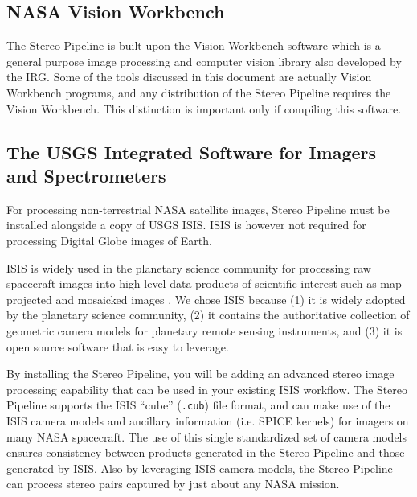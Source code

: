 \subsection{NASA Vision Workbench}

The Stereo Pipeline is built upon the Vision Workbench software
which is a general purpose image processing and computer vision
library also developed by the \ac{IRG}.  Some of the tools discussed
in this document are actually Vision Workbench programs, and any
distribution of the Stereo Pipeline requires the Vision Workbench.
This distinction is important only if compiling this software.

\subsection{The USGS Integrated Software for Imagers and Spectrometers}

For processing non-terrestrial NASA satellite images, Stereo Pipeline
must be installed alongside a copy of \ac{USGS} \ac{ISIS}. \ac{ISIS} is
however not required for processing Digital Globe images of Earth.

\ac{ISIS} is widely used in the planetary science community
for processing raw spacecraft images into high level data products of
scientific interest such as map-projected and mosaicked images
\cite{2004LPI....35.2039A, 1997LPI....28..387G, ISIS_website}.  We
chose \ac{ISIS} because (1) it is widely adopted by the planetary
science community, (2) it contains the authoritative collection of
geometric camera models for planetary remote sensing instruments, and
(3) it is open source software that is easy to leverage.

By installing the Stereo Pipeline, you will be adding an advanced
stereo image processing capability that can be used in your existing
\ac{ISIS} workflow.  The Stereo Pipeline supports the \ac{ISIS}
``cube'' (\texttt{.cub}) file format, and can make use of the \ac{ISIS}
camera models and ancillary information (i.e. SPICE kernels) for
imagers on many \ac{NASA} spacecraft.  The use of this single standardized
set of camera models ensures consistency between products generated
in the Stereo Pipeline and those generated by \ac{ISIS}.  Also by
leveraging \ac{ISIS} camera models, the Stereo Pipeline can process
stereo pairs captured by just about any \ac{NASA} mission.


%
%
%
%

